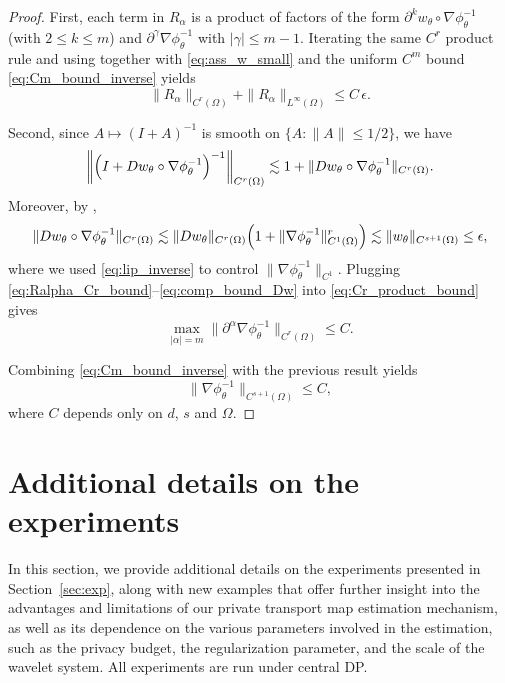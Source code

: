 \documentclass{article}
\newcommand{\1}{\mathds{1}}
\theoremstyle{plain}
\theoremstyle{definition}
\theoremstyle{remark}
\begin{document}
\begin{proof}
First, each term in $R_\alpha$ is a product of factors of the form $\partial^k w_\theta\circ\nabla\phi_\theta^{-1}$
(with $2\le k\le m$) and $\partial^\gamma \nabla\phi_\theta^{-1}$ with $|\gamma|\le m-1$.
Iterating the same $C^r$ product rule and using  together with
\eqref{eq:ass_w_small} and the uniform $C^m$ bound \eqref{eq:Cm_bound_inverse} yields
\begin{equation}
\label{eq:Ralpha_Cr_bound}
\|R_\alpha\|_{C^r(\Omega)} + \|R_\alpha\|_{L^\infty(\Omega)} \le C\,\epsilon.
\end{equation}

Second, since $A\mapsto(I+A)^{-1}$ is smooth on $\{A:\|A\|\le 1/2\}$, we have
\begin{equation}
\label{eq:inverse_map_bound}
\left\|\Bigl(I+Dw_\theta\circ\nabla\phi_\theta^{-1}\Bigr)^{-1}\right\|_{C^r(\Omega)}
\lesssim
1 + \|Dw_\theta\circ\nabla\phi_\theta^{-1}\|_{C^r(\Omega)}.
\end{equation}
Moreover, by ,
\begin{equation}
\label{eq:comp_bound_Dw}
\|Dw_\theta\circ\nabla\phi_\theta^{-1}\|_{C^r(\Omega)}
\lesssim
\|Dw_\theta\|_{C^r(\Omega)}\Bigl(1+\|\nabla\phi_\theta^{-1}\|_{C^{1}(\Omega)}^{r}\Bigr)
\lesssim
\|w_\theta\|_{C^{s+1}(\Omega)}
\le \epsilon,
\end{equation}
where we used \eqref{eq:lip_inverse} to control $\|\nabla\phi_\theta^{-1}\|_{C^1}$.
Plugging \eqref{eq:Ralpha_Cr_bound}--\eqref{eq:comp_bound_Dw} into \eqref{eq:Cr_product_bound} gives
\begin{equation}
\max_{|\alpha|=m}\|\partial^\alpha \nabla\phi_\theta^{-1}\|_{C^r(\Omega)} \le C.
\end{equation}


Combining \eqref{eq:Cm_bound_inverse} with the previous result yields
\begin{equation}
\|\nabla\phi_\theta^{-1}\|_{C^{s+1}(\Omega)} \le C,
\end{equation}
where $C$ depends only on $d$, $s$ and $\Omega$.
\end{proof}





\section{Additional details on the experiments} \label{appendix:add_details}
\label{sec:add_xp_details}

In this section, we provide additional details on the experiments presented in Section~\ref{sec:exp}, along with new examples that offer further insight into the advantages and limitations of our private transport map estimation mechanism, as well as its dependence on the various parameters involved in the estimation, such as the privacy budget, the regularization parameter, and the scale of the wavelet system. All experiments are run under central DP.
\end{document}

